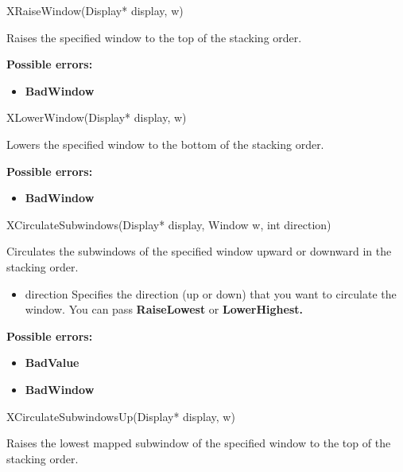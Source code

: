 \documentclass{report}
\begin{document}
\begin{itemize}
            \begin{cppcode}
                XRaiseWindow(Display* display, w)
            \end{cppcode}
            \bigbreak \noindent
            Raises the specified window to the top of the stacking order.

            \bigbreak \noindent
            \textbf{Possible errors:}
            \begin{itemize}
                \item \textbf{BadWindow}
            \end{itemize}

            \begin{cppcode}
                XLowerWindow(Display* display, w)
            \end{cppcode}
            \bigbreak \noindent
            Lowers the specified window to the bottom of the stacking order.

            \bigbreak \noindent
            \textbf{Possible errors:}
            \begin{itemize}
                \item \textbf{BadWindow}
            \end{itemize}

            \begin{cppcode}
                XCirculateSubwindows(Display* display, Window w, int direction)
            \end{cppcode}
            \bigbreak \noindent
            Circulates the subwindows of the specified window upward or downward in the stacking order.

            \begin{itemize}
                \item direction Specifies the direction (up or down) that you want to circulate the window. You can pass \textbf{RaiseLowest} or \textbf{LowerHighest.}
            \end{itemize}

            \bigbreak \noindent
            \textbf{Possible errors:}
            \begin{itemize}
                \item \textbf{BadValue}
                \item \textbf{BadWindow}
            \end{itemize}

            \begin{cppcode}
                XCirculateSubwindowsUp(Display* display, w)
            \end{cppcode}
            \bigbreak \noindent
            Raises the lowest mapped subwindow of the specified window to the top of the stacking order.


\end{itemize}
\end{document}
